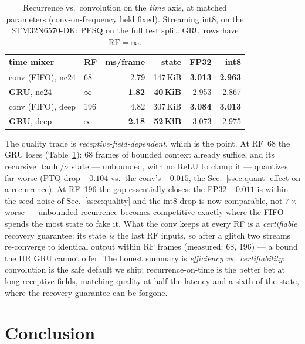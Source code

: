 \documentclass{article}
\begin{document}
\begin{table}[t]
  \centering
  \caption{Recurrence vs.\ convolution on the \emph{time} axis, at matched
  parameters (conv-on-frequency held fixed). Streaming int8, on the
  STM32N6570-DK; PESQ on the full test split. GRU rows have $\mathrm{RF}=\infty$.}
  \label{tab:recurrence}
  \small
  \setlength{\tabcolsep}{4pt}
  \begin{tabular}{@{}llrrrr@{}}
    \toprule
    time mixer & RF & ms/frame & state & FP32 & int8 \\
    \midrule
    conv (FIFO), nc24     &  68 & 2.79 & 147\,KiB & \textbf{3.013} & \textbf{2.963} \\
    \textbf{GRU}, nc24     & $\infty$ & \textbf{1.82} & \textbf{40\,KiB} & 2.953 & 2.867 \\
    \midrule
    conv (FIFO), deep     & 196 & 4.82 & 307\,KiB & \textbf{3.084} & \textbf{3.013} \\
    \textbf{GRU}, deep     & $\infty$ & \textbf{2.18} & \textbf{52\,KiB} & 3.073 & 2.975 \\
    \bottomrule
  \end{tabular}
\end{table}

The quality trade is \emph{receptive-field-dependent}, which is the point. At
RF~68 the GRU loses (Table~\ref{tab:recurrence}): 68 frames of bounded context
already suffice, and its recursive $\tanh/\sigma$ state --- unbounded, with no
ReLU to clamp it --- quantizes far worse (PTQ drop $-0.104$ vs.\ the conv's
$-0.015$, the Sec.~\ref{ssec:quant} effect on a recurrence). At RF~196 the gap
essentially closes: the FP32 $-0.011$ is within the seed noise of
Sec.~\ref{ssec:quality} and the int8 drop is now comparable, not $7\times$
worse --- unbounded recurrence becomes competitive exactly where the FIFO
spends the most state to fake it. What the conv keeps at every RF is a
\emph{certifiable} recovery guarantee: its state \emph{is} the last
$\mathrm{RF}$ inputs, so after a glitch two streams re-converge to identical
output within $\mathrm{RF}$ frames (measured: 68, 196) --- a bound the IIR GRU
cannot offer. The honest summary is \emph{efficiency vs.\ certifiability}:
convolution is the safe default we ship; recurrence-on-time is the better bet
at long receptive fields, matching quality at half the latency and a sixth of
the state, where the recovery guarantee can be forgone.

\section{Conclusion}
\label{sec:conclusion}
\end{document}
